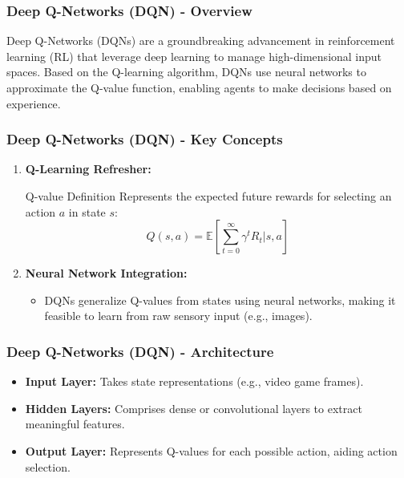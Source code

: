 \documentclass[aspectratio=169]{beamer}
\begin{document}
\begin{frame}[fragile]
    \frametitle{Deep Q-Networks (DQN) - Overview}
    Deep Q-Networks (DQNs) are a groundbreaking advancement in 
    reinforcement learning (RL) that leverage deep learning to manage 
    high-dimensional input spaces. Based on the Q-learning algorithm, 
    DQNs use neural networks to approximate the Q-value function, 
    enabling agents to make decisions based on experience.
\end{frame}

\begin{frame}[fragile]
    \frametitle{Deep Q-Networks (DQN) - Key Concepts}
    \begin{enumerate}
        \item \textbf{Q-Learning Refresher:}
        \begin{block}{Q-value Definition}
            Represents the expected future rewards for selecting an action \( a \) in state \( s \):
            \begin{equation}
                Q(s, a) = \mathbb{E}\left[\sum_{t=0}^{\infty} \gamma^t R_t | s, a\right]
            \end{equation}
        \end{block}
        
        \item \textbf{Neural Network Integration:}
        \begin{itemize}
            \item DQNs generalize Q-values from states using neural networks, making it feasible to learn from raw sensory input (e.g., images).
        \end{itemize}
    \end{enumerate}
\end{frame}

\begin{frame}[fragile]
    \frametitle{Deep Q-Networks (DQN) - Architecture}
    \begin{itemize}
        \item \textbf{Input Layer:} Takes state representations (e.g., video game frames).
        \item \textbf{Hidden Layers:} Comprises dense or convolutional layers to extract meaningful features.
        \item \textbf{Output Layer:} Represents Q-values for each possible action, aiding action selection.
    \end{itemize}
\end{frame}
\end{document}

